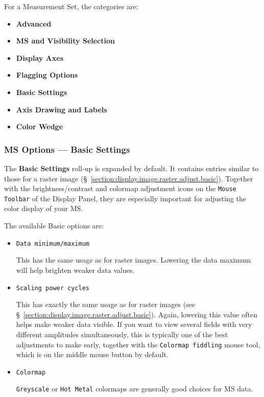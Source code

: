 For a Measurement Set, the categories are:
\begin{itemize}
   \item {\bf Advanced}
   \item {\bf MS and Visibility Selection}
   \item {\bf Display Axes}
   \item {\bf Flagging Options}
   \item {\bf Basic Settings}
   \item {\bf Axis Drawing and Labels}
   \item {\bf Color Wedge}
\end{itemize}


\subsubsection{MS Options --- Basic Settings}
\label{section:display.ms.adjust.basic}

The {\bf Basic Settings} roll-up is expanded by
default.  It contains entries similar to
those for a raster image (\S~\ref{section:display.image.raster.adjust.basic}). 
Together with the brightness/contrast and colormap adjustment icons
on the {\tt Mouse Toolbar} of the Display Panel, they are especially
important for adjusting the color display of your MS.

The available Basic options are:

\begin{itemize}

\item {\tt Data minimum/maximum}

This has the same usage as for raster images.  
Lowering the data maximum will help brighten
weaker data values.

\item {\tt Scaling power cycles}

This has exactly the same usage as for raster images (see
\S~\ref{section:display.image.raster.adjust.basic}).  Again, lowering
this value often helps make weaker data visible.  If you want to view
several fields with very different amplitudes simultaneously, this is
typically one of the best adjustments to make early, together with the
{\tt Colormap fiddling} mouse tool, which is on the middle mouse button
by default.

\item {\tt Colormap}

{\tt Greyscale} or {\tt Hot Metal} colormaps are generally good choices
for MS data.

\end{itemize}



